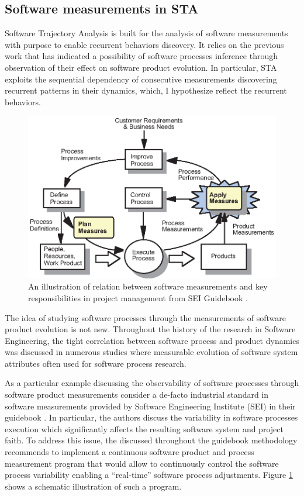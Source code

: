 \subsection{Software measurements in STA}
Software Trajectory Analysis is built for the analysis of software measurements with purpose to enable recurrent 
behaviors discovery. It relies on the previous work that has indicated a possibility of software processes inference 
through observation of their effect on software product evolution. 
In particular, STA exploits the sequential dependency of consecutive measurements discovering recurrent patterns 
in their dynamics, which, I hypothesize reflect the recurrent behaviors.

\begin{figure}[t]
   \centering
   \includegraphics[width=115mm]{figures/SEI-measurements.eps}
   \caption{An illustration of relation between software measurements and key responsibilities in project management 
     from SEI Guidebook \cite{citeulike:10567306}.}
   \label{fig:sei-measures}
\end{figure}

The idea of studying software processes through the measurements of software product evolution is not new.
Throughout the history of the research in Software Engineering, the tight correlation between software process and 
product dynamics was discussed in numerous studies where measurable evolution of software system attributes 
often used for software process research.

As a particular example discussing the observability of software processes through software product measurements 
consider a de-facto industrial standard in software measurements provided by Software Engineering Institute (SEI) in 
their guidebook \cite{citeulike:10567306}. In particular, the authors discuss the variability in software processes 
execution which significantly affects the resulting software system and project faith. To address this issue, the 
discussed throughout the guidebook methodology recommends to implement a continuous software product and 
process measurement program that would allow to continuously control the software process variability 
enabling a ``real-time'' software process adjustments. 
Figure \ref{fig:sei-measures} shows a schematic illustration of such a program.


